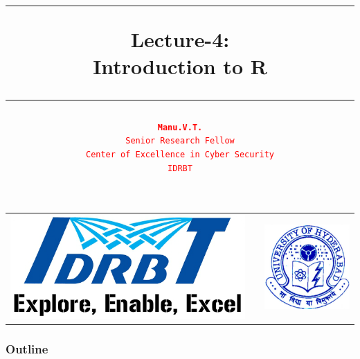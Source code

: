 \documentclass[12pt]{beamer}
\date{}
\title{\textcolor{idrbt_blue}{\rule{112mm}{1.25mm}} \textbf{Lecture-4:\\ Introduction to R}
	 \textcolor{idrbt_blue}{\rule{112mm}{1.25mm}}}
\author{\textcolor{red}{\texttt{\textbf{Manu.V.T.}\\ 
			{\scriptsize Senior Research Fellow\\ Center of Excellence in Cyber Security\\IDRBT}}} }%
\begin{document}
	
	\begin{frame}
	\titlepage
	


\begin{center}
			\begin{tabular}{l>{\centering}p{6.25cm}<{\centering}l}
			\multirow{1}{*}{\includegraphics[scale=0.15]{./IDRBT_lowres.png}}
			&
         
			&
			\multirow{1}{*}{\includegraphics[scale=0.2]{./uoh.png}}
		\end{tabular}
\end{center}

\smallskip
	\renewcommand*{\arraystretch}{1.05}



\end{frame}

\begin{frame}
\frametitle{Outline}
\tableofcontents %
\end{frame}
\end{document}
